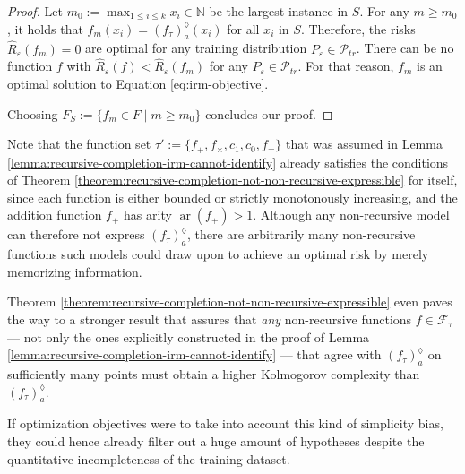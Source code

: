 \begin{proof}
	Let $m_0:=\max_{1\leq i\leq k}x_i \in\mathbb{N}$ be the largest instance in $S$.
	For any $m\geq m_0$, it holds that $f_m(x_i)=\left(f_{\tau}\right)_a^{\lozenge}(x_i)$ for all $x_i$ in $S$.
	Therefore, the risks $\hat{R}_\varepsilon(f_m)=0$ are optimal for any training distribution $P_\varepsilon\in\mathcal{P}_{tr}$.
	There can be no function $f$ with $\hat{R}_{\varepsilon}(f)<\hat{R}_{\varepsilon}(f_m)$ for any $P_\varepsilon\in\mathcal{P}_{tr}$. 
	For that reason, $f_m$ is an optimal solution to Equation \ref{eq:irm-objective}.
	
	Choosing $F_S:=\{f_m\in F\mid m\geq m_0\}$ concludes our proof.
\end{proof}

Note that the function set $\tau':=\{f_{+},f_{\times},c_1,c_0,f_{=}\}$ that was assumed in Lemma \ref{lemma:recursive-completion-irm-cannot-identify} already satisfies the conditions of Theorem \ref{theorem:recursive-completion-not-non-recursive-expressible} for itself, since each function is either bounded or strictly monotonously increasing, and the addition function $f_{+}$ has arity $\operatorname{ar}(f_{+})>1$.
Although any non-recursive model can therefore not express $\left(f_{\tau}\right)_a^{\lozenge}$, there are arbitrarily many non-recursive functions such models could draw upon to achieve an optimal risk by merely memorizing information.

Theorem \ref{theorem:recursive-completion-not-non-recursive-expressible} even paves the way to a stronger result that assures that \textit{any} non-recursive functions $f\in\mathcal{F}_{\tau}$ --- not only the ones explicitly constructed in the proof of Lemma \ref{lemma:recursive-completion-irm-cannot-identify} --- that agree with $\left(f_{\tau}\right)_a^{\lozenge}$ on sufficiently many points must obtain a higher Kolmogorov complexity than $\left(f_{\tau}\right)_a^{\lozenge}$.

If optimization objectives were to take into account this kind of simplicity bias, they could hence already filter out a huge amount of hypotheses despite the quantitative incompleteness of the training dataset.

